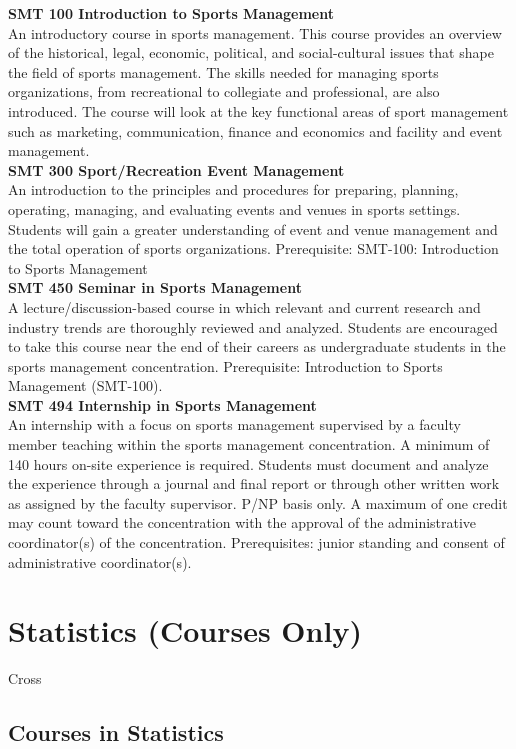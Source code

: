 \documentclass[
  letterpaper,
]{scrbook}
\begin{document}
\textbf{SMT 100 Introduction to Sports Management}\\
An introductory course in sports management. This course provides an
overview of the historical, legal, economic, political, and
social-cultural issues that shape the field of sports management. The
skills needed for managing sports organizations, from recreational to
collegiate and professional, are also introduced. The course will look
at the key functional areas of sport management such as marketing,
communication, finance and economics and facility and event
management.\\
\textbf{SMT 300 Sport/Recreation Event Management}\\
An introduction to the principles and procedures for preparing,
planning, operating, managing, and evaluating events and venues in
sports settings. Students will gain a greater understanding of event and
venue management and the total operation of sports organizations.
Prerequisite: SMT-100: Introduction to Sports Management\\
\textbf{SMT 450 Seminar in Sports Management}\\
A lecture/discussion-based course in which relevant and current research
and industry trends are thoroughly reviewed and analyzed. Students are
encouraged to take this course near the end of their careers as
undergraduate students in the sports management concentration.
Prerequisite: Introduction to Sports Management (SMT-100).\\
\textbf{SMT 494 Internship in Sports Management}\\
An internship with a focus on sports management supervised by a faculty
member teaching within the sports management concentration. A minimum of
140 hours on-site experience is required. Students must document and
analyze the experience through a journal and final report or through
other written work as assigned by the faculty supervisor. P/NP basis
only. A maximum of one credit may count toward the concentration with
the approval of the administrative coordinator(s) of the concentration.
Prerequisites: junior standing and consent of administrative
coordinator(s).

\section{Statistics (Courses Only)}\label{statistics-courses-only}

Cross

\subsection{Courses in Statistics}\label{courses-in-statistics}
\end{document}
